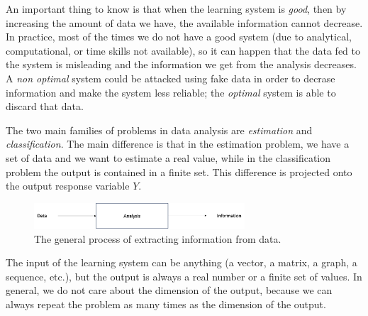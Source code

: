 An important thing to know is that when the learning system is \textit{good}, then by increasing the amount of data we have, the available information cannot decrease. In practice, most of the times we do not have a good system (due to analytical, computational, or time skills not available), so it can happen that the data fed to the system is misleading and the information we get from the analysis decreases. A \textit{non optimal} system could be attacked using fake data in order to decrase information and make the system less reliable; the \textit{optimal} system is able to discard that data.

The two main families of problems in data analysis are \textit{estimation} and \textit{classification}. The main difference is that in the estimation problem,
we have a set of data and we want to estimate a real value, while in the classification problem the output is contained in a finite set. This difference is projected onto the output response variable $Y$.

\begin{figure}[H]
    \centering
    \includegraphics[width=0.7\textwidth]{./figures/chapter_2/data2information.png}
    \caption{The general process of extracting information from data.}
    \label{fig:data2information}
\end{figure}

The input of the learning system can be anything (a vector, a matrix, a graph, a sequence, etc.), but the output is always a real number or a finite set of values. In general,
we do not care about the dimension of the output, because we can always repeat the problem as many times as the dimension of the output.


